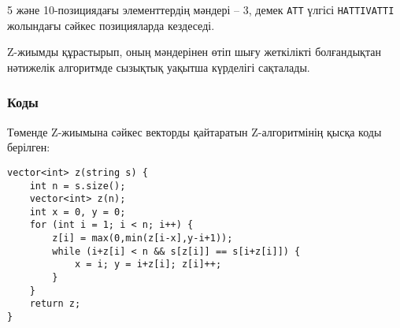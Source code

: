 5 және 10-позициядағы элементтердің мәндері -- 3,
демек \texttt{ATT} үлгісі \texttt{HATTIVATTI} жолындағы
сәйкес позицияларда кездеседі. 


Z-жиымды құрастырып, оның мәндерінен өтіп шығу жеткілікті болғандықтан нәтижелік алгоритмде сызықтық уақытша күрделігі сақталады.


\subsubsection{Коды}

Төменде Z-жиымына сәйкес векторды қайтаратын Z-алгоритмінің қысқа 
коды берілген:


\begin{lstlisting}
vector<int> z(string s) {
    int n = s.size();
    vector<int> z(n);
    int x = 0, y = 0;
    for (int i = 1; i < n; i++) {
        z[i] = max(0,min(z[i-x],y-i+1));
        while (i+z[i] < n && s[z[i]] == s[i+z[i]]) {
            x = i; y = i+z[i]; z[i]++;
        }
    }
    return z;
}
\end{lstlisting}